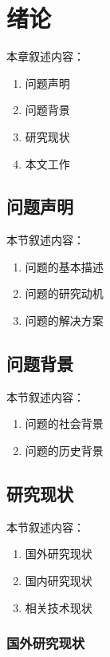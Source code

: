 \chapter{绪\;\;\;论}
\label{chap1}

本章叙述内容：
\begin{enumerate}
  \item 问题声明
  \item 问题背景
  \item 研究现状
  \item 本文工作
\end{enumerate}

\section{问题声明}

本节叙述内容：
\begin{enumerate}
  \item 问题的基本描述
  \item 问题的研究动机
  \item 问题的解决方案
\end{enumerate}

\section{问题背景}

本节叙述内容：
\begin{enumerate}
  \item 问题的社会背景
  \item 问题的历史背景
\end{enumerate}

\section{研究现状}

本节叙述内容：
\begin{enumerate}
  \item 国外研究现状
  \item 国内研究现状
  \item 相关技术现状
\end{enumerate}

\subsection{国外研究现状}

